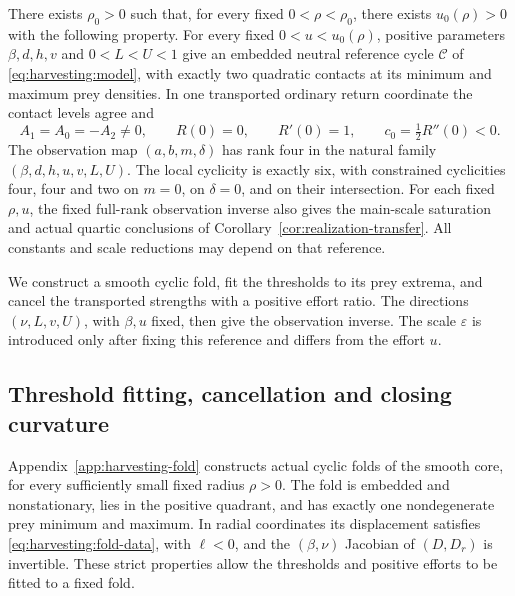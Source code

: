 \begin{theorem}
\label{thm:harvesting-realization}
There exists \(\rho_0>0\) such that, for every fixed
\(0<\rho<\rho_0\), there exists \(u_0(\rho)>0\) with the following
property. For every fixed \(0<u<u_0(\rho)\), positive parameters
\(\beta,d,h,v\) and \(0<L<U<1\) give an embedded neutral reference
cycle \(\mathcal C\) of \eqref{eq:harvesting:model}, with exactly two
quadratic contacts at its minimum and maximum prey densities. In one
transported ordinary return coordinate the contact levels agree and
\[
 A_1=A_0=-A_2\ne0,\qquad
 R(0)=0,\qquad R'(0)=1,\qquad c_0=\tfrac12R''(0)<0.
\]
The observation map \((a,b,m,\delta)\) has rank four in the natural
family \((\beta,d,h,u,v,L,U)\). The local cyclicity is exactly six,
with constrained cyclicities four, four and two on \(m=0\), on
\(\delta=0\), and on their intersection. For each fixed \(\rho,u\),
the fixed full-rank observation inverse also gives the main-scale
saturation and actual quartic conclusions of
Corollary~\ref{cor:realization-transfer}.
All constants and scale reductions may depend on that reference.
\end{theorem}

We construct a smooth cyclic fold, fit the thresholds to its prey
extrema, and cancel the transported strengths with a positive effort
ratio. The directions \((\nu,L,v,U)\), with \(\beta,u\) fixed,
then give the observation inverse. The scale \(\varepsilon\) is
introduced only after fixing this reference and differs from the
effort \(u\).

\subsection{Threshold fitting, cancellation and closing curvature}

Appendix~\ref{app:harvesting-fold} constructs actual cyclic folds of
the smooth core, for every sufficiently small fixed radius \(\rho>0\).
The fold is embedded and nonstationary, lies in the positive quadrant,
and has exactly one nondegenerate prey minimum and maximum. In radial
coordinates its displacement satisfies
\eqref{eq:harvesting:fold-data}, with \(\ell<0\), and the
\((\beta,\nu)\) Jacobian of \((D,D_r)\) is invertible.
These strict properties allow the thresholds and positive efforts to be
fitted to a fixed fold.

